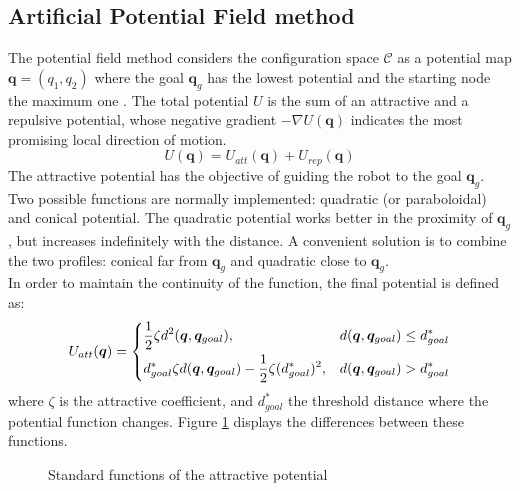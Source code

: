 \subsection{Artificial Potential Field method}
The potential field method considers the configuration space $\mathcal{C}$ as a potential map $\bm{q}=(q_1,q_2)$ where the goal $\bm{q}_g$ has the lowest potential and the starting node the maximum one \cite{khatib1986real}. The total potential $U$ is the sum of an attractive and a repulsive potential, whose negative gradient $-\nabla U(\bm{q})$ indicates the most promising local direction of motion.
\begin{equation}
	U(\bm{q})=U_{att}(\bm{q}) + U_{rep}(\bm{q})
\end{equation}
The attractive potential has the objective of guiding the robot to the goal $\bm{q}_g$. Two possible functions are normally implemented: quadratic (or paraboloidal) and conical potential. 
The quadratic potential works better in the proximity of $\bm{q}_g$, but increases indefinitely with the distance. A convenient solution is to combine the two profiles: conical far from $\bm{q}_g$ and quadratic close to $\bm{q}_g$. \\
In order to maintain the continuity of the function, the final potential is defined as:
\begin{equation}
	U_{att}(\bm{q})=
	\begin{dcases}
		\frac{1}{2}\zeta d^2(\bm{q},\bm{q}_{goal}), & d(\bm{q},\bm{q}_{goal})\leq d^*_{goal} \\
		d^*_{goal}\zeta d(\bm{q},\bm{q}_{goal}) -\frac{1}{2}\zeta(d^*_{goal})^2,  & d(\bm{q},\bm{q}_{goal}) > d^*_{goal} 
	\end{dcases}
\end{equation}
where $\zeta$ is the attractive coefficient, and $d^*_{goal}$ the threshold distance where the potential function changes. Figure \ref{potentialfield} displays the differences between these functions.
\begin{figure}[h]
	\centering
	\hspace{0.2cm}
	\centering
	\hspace{0.2cm}
	\caption{Standard functions of the attractive potential} 
	\label{potentialfield}
\end{figure}

